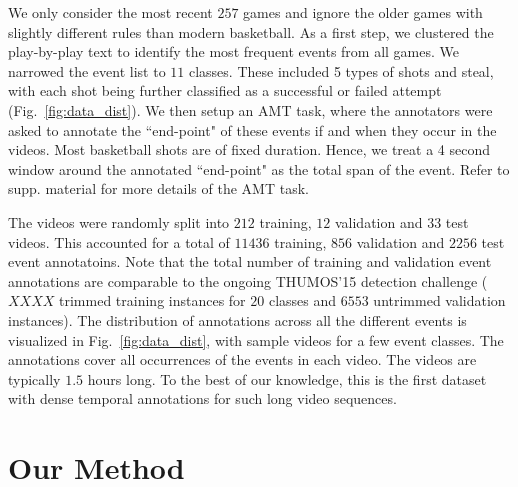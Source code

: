 \documentclass[10pt,twocolumn,letterpaper]{article}
\begin{document}
We only consider the most recent $257$ games and ignore the older games with
slightly different rules than modern basketball.  As a first step, we clustered the
play-by-play text to identify the most frequent events from all games. We
narrowed the event list to $11$ classes. These included 5 types of shots and
steal, with each shot being further classified as a successful or failed
attempt (Fig.~\ref{fig:data_dist}). We then setup an AMT task, where the
annotators were asked to annotate the ``end-point" of these events if and when
they occur in the videos. Most basketball shots are of fixed duration. Hence,
we treat a 4 second window around the annotated ``end-point" as the total span
of the event.  Refer to supp. material for more details of the AMT task.

The videos were randomly split into $212$ training, $12$ validation and $33$
test videos. This accounted for a total of $11436$ training, $856$ validation
and $2256$ test event annotatoins. Note that the total number of training and
validation event annotations are comparable to the ongoing THUMOS'15 detection
challenge ($XXXX$ trimmed training instances for $20$ classes and $6553$
untrimmed validation instances). The distribution of annotations across all the
different events is visualized in Fig.~\ref{fig:data_dist}, with sample videos
for a few event classes. The annotations cover all occurrences of the
events in each video. The videos are typically $1.5$ hours long.  To the best of our
knowledge, this is the first dataset with dense temporal annotations for
such long video sequences.

\section{Our Method}
\end{document}
